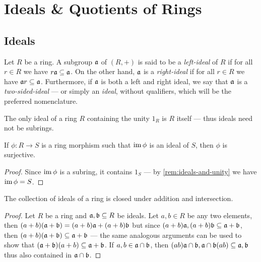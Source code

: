 \section{Ideals \& Quotients of Rings}

\subsection{Ideals}

\begin{definition}[Ideal]
\label{def:ring-ideal}
Let \(R\) be a ring. A subgroup \(\mathfrak{a}\) of \((R, +)\) is said to be a
\emph{left-ideal} of \(R\) if for all \(r \in R\) we have
\(r \mathfrak{a} \subseteq \mathfrak{a}\). On the other hand, \(\mathfrak{a}\) is a
\emph{right-ideal} if for all \(r \in R\) we have
\(\mathfrak{a} r \subseteq \mathfrak{a}\). Furthermore, if \(\mathfrak{a}\) is both a
left and right ideal, we say that \(\mathfrak{a}\) is a \emph{two-sided-ideal} ---
or simply an \emph{ideal}, without qualifiers, which will be the preferred
nomenclature.
\end{definition}

\begin{remark}
\label{rem:ideals-and-unity}
The only ideal of a ring \(R\) containing the unity \(1_R\) is \(R\) itself ---
thus ideals need not be subrings.
\end{remark}

\begin{corollary}
\label{cor:image-is-ideal-then-surjective}
If \(\phi: R \to S\) is a ring morphism such that \(\operatorname{im} \phi\) is an ideal of
\(S\), then \(\phi\) is surjective.
\end{corollary}

\begin{proof}
Since \(\operatorname{im} \phi\) is a subring, it contains \(1_S\) --- by
\cref{rem:ideals-and-unity} we have \(\operatorname{im} \phi = S\).
\end{proof}

\begin{corollary}
\label{cor:ideals-addition-intersection}
The collection of ideals of a ring is closed under addition and intersection.
\end{corollary}

\begin{proof}
Let \(R\) be a ring and \(\mathfrak{a}, \mathfrak{b} \subseteq R\) be ideals. Let
\(a, b \in R\) be any two elements, then
\((a + b)(\mathfrak{a} + \mathfrak{b}) = (a + b) \mathfrak{a} + (a + b) \mathfrak{b}\) but
since \((a + b) \mathfrak{a}, (a + b) \mathfrak{b} \subseteq \mathfrak{a} + \mathfrak{b}\),
then \((a + b) (\mathfrak{a} + \mathfrak{b}) \subseteq \mathfrak{a} + \mathfrak{b}\) --- the
same analogous arguments can be used to show that
\((\mathfrak{a} + \mathfrak{b})(a + b) \subseteq \mathfrak{a} + \mathfrak{b}\). If
\(a, b \in \mathfrak{a} \cap \mathfrak{b}\), then
\((ab) \mathfrak{a} \cap \mathfrak{b}, \mathfrak{a} \cap \mathfrak{b} (a b) \subseteq
\mathfrak{a}, \mathfrak{b}\) thus also contained in \(\mathfrak{a} \cap \mathfrak{b}\).
\end{proof}

